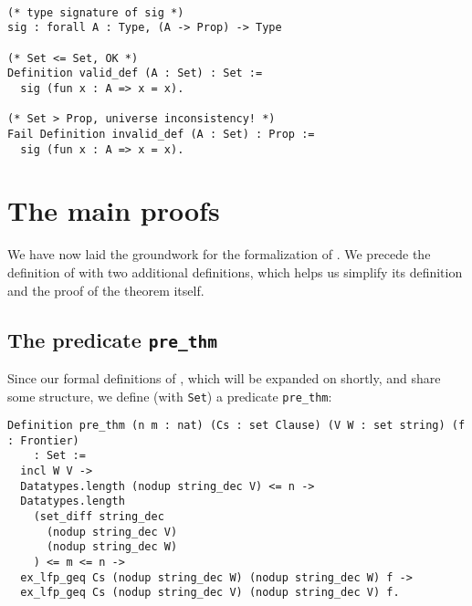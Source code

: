 \begin{minipage}{\linewidth}
\begin{lstlisting}[language=Coq, label={lst:universe_inconsistency}, caption={A universe inconsistency in Coq}]

(* type signature of sig *)
sig : forall A : Type, (A -> Prop) -> Type

(* Set <= Set, OK *)
Definition valid_def (A : Set) : Set :=
  sig (fun x : A => x = x).

(* Set > Prop, universe inconsistency! *)
Fail Definition invalid_def (A : Set) : Prop :=
  sig (fun x : A => x = x).
\end{lstlisting}
\end{minipage}


\section{The main proofs}

We have now laid the groundwork for the formalization of .
We precede the definition of  with two additional definitions, which helps us simplify its
definition and the proof of the theorem itself.

\subsection{The predicate \lstinline{pre_thm}}

Since our formal definitions of , which will be expanded on shortly,
and  share some structure, we define (with \lstinline{Set}) a predicate \lstinline{pre_thm}:

\begin{minipage}{\linewidth}
\begin{lstlisting}[language=Coq, label={lst:pre_thm_def}, caption={\lstinline{pre_thm} in Coq}]
Definition pre_thm (n m : nat) (Cs : set Clause) (V W : set string) (f : Frontier)
    : Set :=
  incl W V ->
  Datatypes.length (nodup string_dec V) <= n ->
  Datatypes.length
    (set_diff string_dec
      (nodup string_dec V)
      (nodup string_dec W)
    ) <= m <= n ->
  ex_lfp_geq Cs (nodup string_dec W) (nodup string_dec W) f ->
  ex_lfp_geq Cs (nodup string_dec V) (nodup string_dec V) f.
\end{lstlisting}
\end{minipage}

\subsection{}

